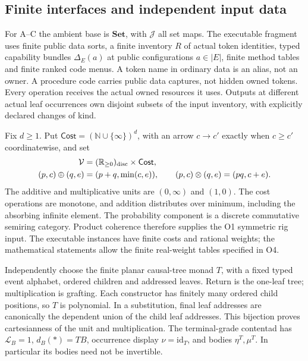 \documentclass[11pt,a4paper]{article}
\theoremstyle{definition}
\newcommand{\Set}{\mathbf{Set}}
\newcommand{\Cost}{\mathsf{Cost}}
\newcommand{\id}{\mathrm{id}}
\begin{document}
\subsection{Finite interfaces and independent input data}\label{sec:core-input}
For A--C the ambient base is $\Set$, with $\mathcal J$ all set maps. The
executable fragment uses finite public data sorts, a finite inventory $R$
of actual token identities, typed capability bundles $\Delta_E(a)$ at
public configurations $a\in|E|$, finite method tables and finite ranked
code menus. A token name in ordinary data is an alias, not an owner.
A procedure code carries public data captures, not hidden owned tokens.
Every operation receives the actual owned resources it uses. Outputs at
different actual leaf occurrences own disjoint subsets of the input
inventory, with explicitly declared changes of kind.

Fix $d\geq1$. Put $\Cost=(\mathbb N\cup\{\infty\})^d$, with an arrow
$c\to c'$ exactly when $c\geq c'$ coordinatewise, and set
\begin{equation}\label{eq:joint-rig}
\begin{split}
\mathcal V&=(\mathbb R_{\geq0})_{\rm disc}\times\Cost,\\
(p,c)\oplus(q,e)&=(p+q,\min(c,e)),\qquad
(p,c)\otimes(q,e)=(pq,c+e).
\end{split}
\end{equation}
The additive and multiplicative units are $(0,\infty)$ and $(1,0)$.
The cost operations are monotone, and addition distributes over minimum,
including the absorbing infinite element. The probability component is
a discrete commutative semiring category. Product coherence therefore
supplies the O1 symmetric rig input. The executable instances have finite
costs and rational weights; the mathematical statements allow the finite
real-weight tables specified in O4.

Independently choose the finite planar causal-tree monad $T$, with a
fixed typed event alphabet, ordered children and addressed leaves.
Return is the one-leaf tree; multiplication is grafting. Each constructor
has finitely many ordered child positions, so $T$ is polynomial. In a
substitution, final leaf addresses are canonically the dependent union
of the child leaf addresses. This bijection proves cartesianness of the
unit and multiplication. The terminal-grade contentad has
$\mathcal L_B=1$, $d_B(*)=TB$, occurrence display $\nu=\id_T$, and bodies
$\eta^T,\mu^T$. In particular its bodies need not be invertible.
\end{document}
